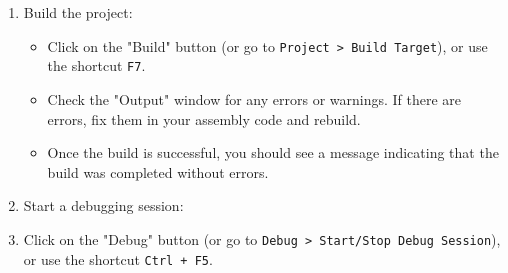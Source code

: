 \begin{enumerate}[nosep]
    \item Build the project:
    \begin{itemize}[nosep]
        \item Click on the "Build" button (or go to \texttt{Project > Build Target}), or use the shortcut \texttt{F7}.
        \item Check the "Output" window for any errors or warnings. If there are errors, fix them in your assembly code and rebuild.
        \item Once the build is successful, you should see a message indicating that the build was completed without errors.
    \end{itemize}
    \item Start a debugging session:
    \item Click on the "Debug" button (or go to \texttt{Debug > Start/Stop Debug Session}), or use the shortcut \texttt{Ctrl + F5}.
\end{enumerate}
